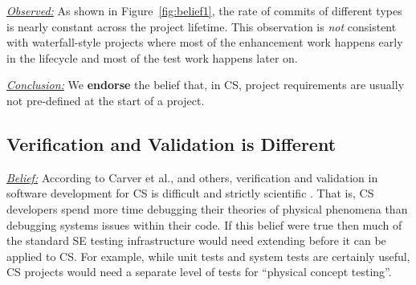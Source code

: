 \documentclass[sigconf,review,anonymous]{acmart}
\newcommand{\bi}{\begin{itemize}}
\newcommand{\ei}{\end{itemize}}
\newcommand{\fig}[1]{Figure~\ref{fig:#1}}
\newenvironment{RQ}{\vspace{1mm}\begin{tcolorbox}[enhanced,width=3.4in,size=fbox,colback=red!5!white,drop shadow southeast,sharp corners]}{\end{tcolorbox}}
\begin{document}





\noindent \textit{\underline{Observed:}} 
As shown in \fig{belief1}, the rate
of commits of different types
is nearly constant across the project
lifetime. This observation is {\em not} consistent with 
waterfall-style projects where most of the enhancement work happens early in the lifecycle and most of the test work happens later on.
\vspace{-2mm}
\begin{RQ}
\textit{\underline{Conclusion:}}
We \textbf{endorse} the belief that, in CS, project requirements are usually not pre-defined
at the start of a project.
\end{RQ}
 





\subsection{Verification and Validation is Different}\label{vv}
\textit{\underline{Belief:}} 
According to Carver et al., and others, 
verification and validation in software development for CS is difficult and strictly scientific \cite{carver07_environment, kanewala13_testing, carver06_hpc, Prabhu11_cssurvey, basili08_hpc}.
That is, CS developers spend more time debugging their theories
of physical phenomena than debugging systems issues within their code.
If this belief were true then much of the standard SE testing
infrastructure would need extending before it can be applied to CS. For example,
while unit tests and system tests are certainly useful, CS projects would need a separate level of tests for ``physical concept testing''. 
\end{document}
